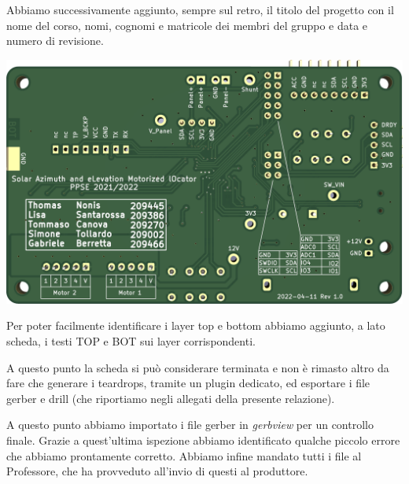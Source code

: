 Abbiamo successivamente aggiunto, sempre sul retro, il titolo del
progetto con il nome del corso, nomi, cognomi e matricole dei membri del
gruppo e data e numero di revisione.

\begin{center}
\includegraphics[scale=0.2]{figures/image42.png}
\captionsetup{type=figure}
\end{center}

Per poter facilmente identificare i layer top e bottom abbiamo aggiunto,
a lato scheda, i testi TOP e BOT sui layer corrispondenti.

A questo punto la scheda si può considerare terminata e non è rimasto
altro da fare che generare i teardrops, tramite un plugin dedicato, ed
esportare i file gerber e drill (che riportiamo negli allegati della
presente relazione).

A questo punto abbiamo importato i file gerber in \emph{gerbview} per un
controllo finale. Grazie a quest'ultima ispezione abbiamo identificato
qualche piccolo errore che abbiamo prontamente corretto. Abbiamo infine
mandato tutti i file al Professore, che ha provveduto all'invio di
questi al produttore.
